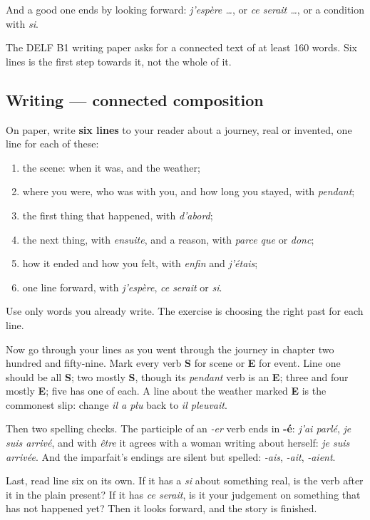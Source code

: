 And a good one ends by looking forward: \emph{j'espère …}, or \emph{ce serait …}, or a condition with \emph{si}.

The DELF B1 writing paper asks for a connected text of at least 160 words. Six lines is the first step towards it, not the whole of it.

\subsection*{Writing — connected composition}
On paper, write \textbf{six lines} to your reader about a journey, real or invented, one line for each of these:

\begin{enumerate}
\raggedright
  \item the scene: when it was, and the weather;
  \item where you were, who was with you, and how long you stayed, with \emph{pendant};
  \item the first thing that happened, with \emph{d'abord};
  \item the next thing, with \emph{ensuite}, and a reason, with \emph{parce que} or \emph{donc};
  \item how it ended and how you felt, with \emph{enfin} and \emph{j'étais};
  \item one line forward, with \emph{j'espère}, \emph{ce serait} or \emph{si}.
\end{enumerate}

Use only words you already write. The exercise is choosing the right past for each line.

\begin{tcolorbox}[breakable,colback=teal!4,colframe=teal!35!black,title={Before you move on}]
Now go through your lines as you went through the journey in chapter two hundred and fifty-nine. Mark every verb \textbf{S} for scene or \textbf{E} for event. Line one should be all \textbf{S}; two mostly \textbf{S}, though its \emph{pendant} verb is an \textbf{E}; three and four mostly \textbf{E}; five has one of each. A line about the weather marked \textbf{E} is the commonest slip: change \emph{il a plu} back to \emph{il pleuvait}.

Then two spelling checks. The participle of an \emph{-er} verb ends in \textbf{-é}: \emph{j'ai parlé}, \emph{je suis arrivé}, and with \emph{être} it agrees with a woman writing about herself: \emph{je suis arrivée}. And the imparfait's endings are silent but spelled: \emph{-ais}, \emph{-ait}, \emph{-aient}.

Last, read line six on its own. If it has a \emph{si} about something real, is the verb after it in the plain present? If it has \emph{ce serait}, is it your judgement on something that has not happened yet? Then it looks forward, and the story is finished.
\end{tcolorbox}
